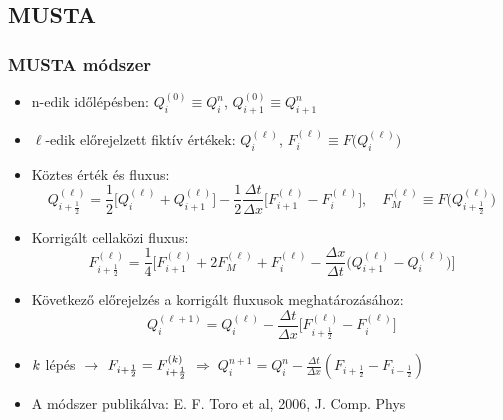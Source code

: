 \documentclass{beamer}
\begin{document}
\subsection{MUSTA}
\begin{frame}
\frametitle{MUSTA módszer}
\begin{itemize}
\item<1-> n-edik időlépésben: $Q^{(0)}_i\equiv Q^n_i$,  $Q^{(0)}_{i+1}\equiv Q^{n}_{i+1}$
\item<1-> $\ell$-edik előrejelzett fiktív értékek: $Q^{(\ell)}_{i}$, $F^{(\ell)}_{i}\equiv F\big(Q^{(\ell)}_{i}\big)$
\item<1-> Köztes érték és fluxus:
\begin{equation*}
Q^{(\ell)}_{i+\frac{1}{2}}=\frac{1}{2}\Big[Q^{(\ell)}_i+Q^{(\ell)}_{i+1}\Big]-\frac{1}{2}\frac{\Delta t}{\Delta x}\Big[F^{(\ell)}_{i+1}-F^{(\ell)}_i\Big], \quad F_M^{(\ell)} \equiv F\big(Q^{(\ell)}_{i+\frac{1}{2}}\big)
\end{equation*}

\item<1-> Korrigált cellaközi fluxus:
\begin{equation*}
F^{(\ell)}_{i+\frac{1}{2}}=\frac{1}{4}\Big[F^{(\ell)}_{i+1}+2F^{(\ell)}_M+F^{(\ell)}_{i}-\frac{\Delta x}{\Delta t}\Big(Q^{(\ell)}_{i+1}-Q^{(\ell)}_i\Big)\Big]
\end{equation*}
\item<1-> Következő előrejelzés a korrigált fluxusok meghatározásához:
\begin{equation*}
Q_i^{(\ell+1)}=Q^{(\ell)}_i-\frac{\Delta t}{\Delta x}\Big[F^{(\ell)}_{i+\frac{1}{2}}-F^{(\ell)}_i\Big]
\end{equation*}
\item<1-> $\mathit\mathbf{{k}}$ lépés $\rightarrow$ $F_{i+\frac{1}{2}}=F_{i+\frac{1}{2}}^{(\mathit\mathbf{{k}})}$ $\Longrightarrow\; Q^{n+1}_i=Q^{n}_i-\frac{\Delta t}{\Delta x}(F_{i+\frac{1}{2}}-F_{i-\frac{1}{2}})$
\item<1-> A módszer publikálva: E. F. Toro et al, 2006, J. Comp. Phys
\end{itemize}
\end{frame}
\end{document}

